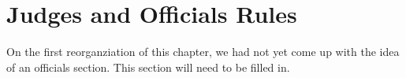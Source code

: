 \chapter{Judges and Officials Rules}

\begin{framed}
On the first reorganziation of this chapter, we had not yet come up with the
idea of an officials section.  This section will need to be filled in.
\end{framed}

